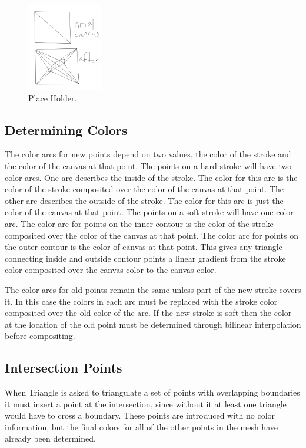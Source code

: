 \documentclass[conference]{acmsiggraph}
\begin{document}
\begin{figure}
    \centering
        \includegraphics[height=1.5in]{images/canvastriangulation}
    \caption{Place Holder.}
\end{figure}


\subsection{Determining Colors}
The color arcs for new points depend on two values, the color of the stroke and the color
of the canvas at that point. The points on a hard stroke will have two color arcs. One
arc describes the inside of the stroke. The color for this arc is the color of the stroke
composited over the color of the canvas at that point. The other arc describes the outside
of the stroke. The color for this arc is just the color of the canvas at that point. The
points on a soft stroke will have one color arc. The color arc for points on the inner
contour is the color of the stroke composited over the color of the canvas at that point.
The color arc for points on the outer contour is the color of canvas at that point.
This gives any triangle connecting inside and outside contour points a linear gradient
from the stroke color composited over the canvas color to the canvas color.

The color arcs for old points remain the same unless part of the new stroke covers it.
In this case the colors in each arc must be replaced with the stroke color composited over
the old color of the arc. If the new stroke is soft then the color at the location of
the old point must be determined through bilinear interpolation before compositing.




\subsection{Intersection Points}

When Triangle is asked to triangulate a set of points with overlapping boundaries it must
insert a point at the intersection, since without it at least one triangle would have to
cross a boundary. These points are introduced with no color information, but the final colors for 
all of the other points in the mesh have already been determined.
\end{document}
